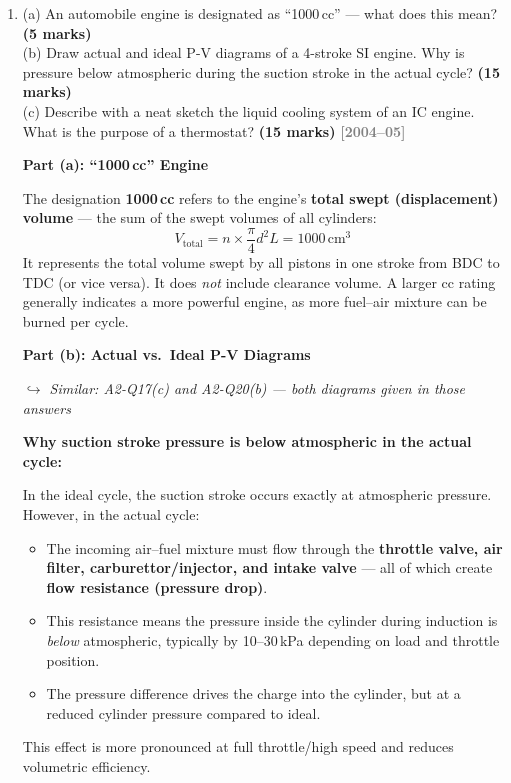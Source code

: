 \documentclass[12pt,a3paper]{article}
\newcommand{\yr}[1]{\hfill\textcolor{gray}{\small\textbf{[#1]}}}
\newcommand{\mk}[1]{\textcolor{orange!70!black}{\small\textbf{(#1 marks)}}}
\newcommand{\variant}[1]{\par\vspace{1pt}\textcolor{blue!50!black}%
  {\footnotesize\textit{$\hookrightarrow$ Similar: #1}}}
\begin{document}
\begin{enumerate}
\begin{tcolorbox}[enhanced,breakable,ansbox,colback=cB!4,colframe=cB,
  boxrule=0.8pt,arc=5pt,
  title={\textbf{Answer}},fonttitle=\bfseries\color{white},colbacktitle=cB]
\end{tcolorbox}

\item \label{qlabel:A2-Q27}
(a) An automobile engine is designated as ``1000\,cc'' --- what does this mean? \mk{5}\\
(b) Draw actual and ideal P-V diagrams of a 4-stroke SI engine. Why is pressure below atmospheric during the suction stroke in the actual cycle? \mk{15}\\
(c) Describe with a neat sketch the liquid cooling system of an IC engine. What is the purpose of a thermostat? \mk{15}
\yr{2004--05}

\begin{tcolorbox}[enhanced,breakable,ansbox,colback=cB!4,colframe=cB,
  boxrule=0.8pt,arc=5pt,
  title={\textbf{Answer}},fonttitle=\bfseries\color{white},colbacktitle=cB]

\textbf{Part (a): ``1000\,cc'' Engine}

The designation \textbf{1000\,cc} refers to the engine's \textbf{total swept
(displacement) volume} — the sum of the swept volumes of all cylinders:
\[
  V_{\text{total}} = n\times\frac{\pi}{4}d^2 L = 1000\,\text{cm}^3
\]
It represents the total volume swept by all pistons in one stroke from BDC to
TDC (or vice versa). It does \emph{not} include clearance volume. A larger cc
rating generally indicates a more powerful engine, as more fuel--air mixture can
be burned per cycle.

\hrulefill

\textbf{Part (b): Actual vs.\ Ideal P-V Diagrams}

\variant{A2-Q17(c) and A2-Q20(b) — both diagrams given in those answers}

\textbf{Why suction stroke pressure is below atmospheric in the actual cycle:}

In the ideal cycle, the suction stroke occurs exactly at atmospheric pressure.
However, in the actual cycle:
\begin{itemize}[leftmargin=1.5em,itemsep=2pt]
  \item The incoming air--fuel mixture must flow through the \textbf{throttle
        valve, air filter, carburettor/injector, and intake valve} — all of which
        create \textbf{flow resistance (pressure drop)}.
  \item This resistance means the pressure inside the cylinder during induction
        is \emph{below} atmospheric, typically by 10--30\,kPa depending on load
        and throttle position.
  \item The pressure difference drives the charge into the cylinder, but at a
        reduced cylinder pressure compared to ideal.
\end{itemize}
This effect is more pronounced at full throttle/high speed and reduces
volumetric efficiency.


\end{tcolorbox}
\end{enumerate}
\end{document}
